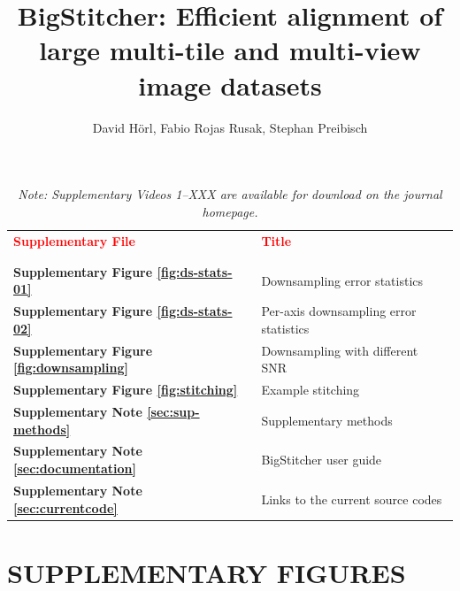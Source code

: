 \documentclass[]{spie}  %
\title{BigStitcher: Efficient alignment of large multi-tile and multi-view image datasets}
\author{David H{\"o}rl, Fabio Rojas Rusak, Stephan Preibisch
}
\newcommand\tablespace{\vspace{2.5mm}}
\begin{document}
\maketitle

\setcounter{page}{1}


\hspace{20mm}

\begin{table}[h!]
\center
{
\fontsize{12pt}{11pt}\selectfont
\center
\begin{tabular}{lp{11cm}}
\textbf{\textcolor{red}{Supplementary File}} & \textbf{\textcolor{red}{Title}}\\ \\
\hline
\\
\textbf{Supplementary Figure \ref{fig:ds-stats-01}} & Downsampling error statistics \tablespace \\
\textbf{Supplementary Figure \ref{fig:ds-stats-02}} & Per-axis downsampling error statistics \tablespace \\
\textbf{Supplementary Figure \ref{fig:downsampling}} &  Downsampling with different SNR \tablespace \\
\textbf{Supplementary Figure \ref{fig:stitching}} & Example stitching \tablespace \\
\textbf{Supplementary Note \ref{sec:sup-methods}} & Supplementary methods \tablespace \\
\textbf{Supplementary Note \ref{sec:documentation}} & BigStitcher user guide \tablespace \\
\textbf{Supplementary Note \ref{sec:currentcode}} & Links to the current source codes \tablespace \\
\end{tabular}}
\caption{\emph{Note: Supplementary Videos 1--XXX are available for download on the journal homepage.}}
\end{table}

\pagebreak

\section*{SUPPLEMENTARY FIGURES}
\end{document}
